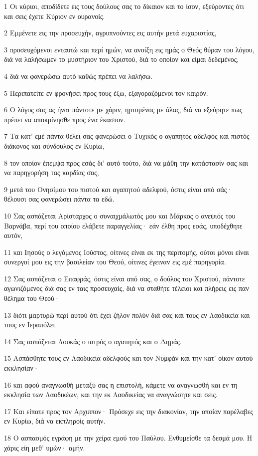 \par 1 Οι κύριοι, αποδίδετε εις τους δούλους σας το δίκαιον και το ίσον, εξεύροντες ότι και σεις έχετε Κύριον εν ουρανοίς.
\par 2 Εμμένετε εις την προσευχήν, αγρυπνούντες εις αυτήν μετά ευχαριστίας,
\par 3 προσευχόμενοι ενταυτώ και περί ημών, να ανοίξη εις ημάς ο Θεός θύραν του λόγου, διά να λαλήσωμεν το μυστήριον του Χριστού, διά το οποίον και είμαι δεδεμένος,
\par 4 διά να φανερώσω αυτό καθώς πρέπει να λαλήσω.
\par 5 Περιπατείτε εν φρονήσει προς τους έξω, εξαγοραζόμενοι τον καιρόν.
\par 6 Ο λόγος σας ας ήναι πάντοτε με χάριν, ηρτυμένος με άλας, διά να εξεύρητε πως πρέπει να αποκρίνησθε προς ένα έκαστον.
\par 7 Τα κατ' εμέ πάντα θέλει σας φανερώσει ο Τυχικός ο αγαπητός αδελφός και πιστός διάκονος και σύνδουλος εν Κυρίω,
\par 8 τον οποίον έπεμψα προς εσάς δι' αυτό τούτο, διά να μάθη την κατάστασίν σας και να παρηγορήση τας καρδίας σας,
\par 9 μετά του Ονησίμου του πιστού και αγαπητού αδελφού, όστις είναι από σάς· θέλουσι σας φανερώσει πάντα τα εδώ.
\par 10 Σας ασπάζεται Αρίσταρχος ο συναιχμάλωτός μου και Μάρκος ο ανεψιός του Βαρνάβα, περί του οποίου ελάβετε παραγγελίας· εάν έλθη προς εσάς, υποδέχθητε αυτόν,
\par 11 και Ιησούς ο λεγόμενος Ιούστος, οίτινες είναι εκ της περιτομής, ούτοι μόνοι είναι συνεργοί μου εις την βασιλείαν του Θεού, οίτινες έγειναν εις εμέ παρηγορία.
\par 12 Σας ασπάζεται ο Επαφράς, όστις είναι από σας, ο δούλος του Χριστού, πάντοτε αγωνιζόμενος διά σας εν ταις προσευχαίς, διά να σταθήτε τέλειοι και πλήρεις εις παν θέλημα του Θεού·
\par 13 διότι μαρτυρώ περί αυτού ότι έχει ζήλον πολύν διά σας και τους εν Λαοδικεία και τους εν Ιεραπόλει.
\par 14 Σας ασπάζεται Λουκάς ο ιατρός ο αγαπητός και ο Δημάς.
\par 15 Ασπάσθητε τους εν Λαοδικεία αδελφούς και τον Νυμφάν και την κατ' οίκον αυτού εκκλησίαν·
\par 16 και αφού αναγνωσθή μεταξύ σας η επιστολή, κάμετε να αναγνωσθή και εν τη εκκλησία των Λαοδικέων, και την εκ Λαοδικείας να αναγνώσητε και σεις.
\par 17 Και είπατε προς τον Αρχιππον· Πρόσεχε εις την διακονίαν, την οποίαν παρέλαβες εν Κυρίω, διά να εκπληροίς αυτήν.
\par 18 Ο ασπασμός εγράφη με την χείρα εμού του Παύλου. Ενθυμείσθε τα δεσμά μου. Η χάρις είη μεθ' υμών· αμήν.



